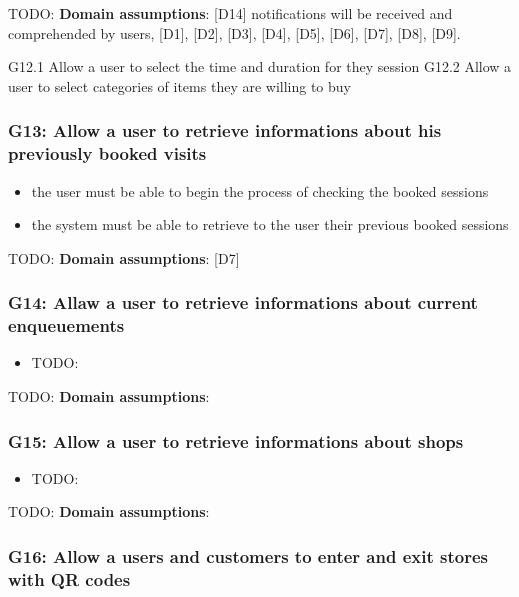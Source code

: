 TODO: \textbf{Domain assumptions}: [D14] notifications will be received and comprehended by users, [D1], [D2], [D3], [D4], [D5], [D6], [D7], [D8], [D9].

G12.1  Allow a user to select the time and duration for they session \newline
G12.2  Allow a user to select categories of items they are willing to buy

\subsubsection{G13: Allow a user to retrieve informations about his previously booked visits}
\label{subsubsect:G13}

\begin{itemize}[topsep=0pt]
    \item the user must be able to begin the process of checking the booked sessions
    \item the system must be able to retrieve to the user their previous booked sessions
\end{itemize}

TODO: \textbf{Domain assumptions}: [D7]

\subsubsection{G14: Allaw a user to retrieve informations about current enqueuements}
\label{subsubsect:G14}

\begin{itemize}[topsep=0pt]
    \item TODO:
\end{itemize}

TODO: \textbf{Domain assumptions}: 

\subsubsection{G15: Allow a user to retrieve informations about shops}
\label{subsubsect:G15}

\begin{itemize}[topsep=0pt]
    \item TODO:
\end{itemize}

TODO: \textbf{Domain assumptions}: 

\subsubsection{G16: Allow a users and customers to enter and exit stores with QR codes}
\label{subsubsect:G16}

